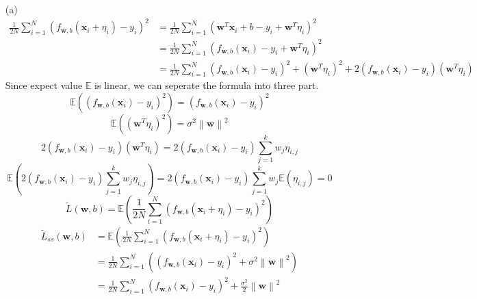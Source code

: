 \documentclass[12pt,a4paper]{article}
\begin{document}
\begin{enumerate}
    \item[(a)]
        \begin{align}
            \frac{1}{2N}\sum_{i=1}^{N}(f_{\mathbf{w},b}(\mathbf{x}_{i}+\eta_{i})-y_{i})^{2} 
                &= \frac{1}{2N}\sum_{i=1}^{N}(\mathbf{w}^{T}\mathbf{x}_i + b - y_{i} + \mathbf{w}^{T}\eta_{i})^2 \\
                &= \frac{1}{2N}\sum_{i=1}^{N}(f_{\mathbf{w}, b}(\mathbf{x}_i) - y_{i} + \mathbf{w}^{T}\eta_{i})^2 \\
                &= \frac{1}{2N}\sum_{i=1}^{N}(f_{\mathbf{w}, b}(\mathbf{x}_i) - y_{i})^2 + (\mathbf{w}^{T}\eta_{i})^2 + 2(f_{\mathbf{w}, b}(\mathbf{x}_i) - y_{i})(\mathbf{w}^{T}\eta_{i})
        \end{align}
        Since expect value $\mathbb{E}$ is linear, we can seperate the formula into three part.
        \[
            \mathbb{E}((f_{\mathbf{w},b}(\mathbf{x}_{i})-y_{i})^2) = (f_{\mathbf{w},b}(\mathbf{x}_{i})-y_{i})^2
        \]
        \[
            \mathbb{E}((\mathbf{w}^{T}\eta_{i})^2) = \sigma^{2}\left\lVert \mathbf{w}\right\rVert ^{2}
        \]
        \[
            2(f_{\mathbf{w}, b}(\mathbf{x}_i) - y_{i})(\mathbf{w}^{T}\eta_{i}) = 2(f_{\mathbf{w}, b}(\mathbf{x}_i) - y_{i}) \sum_{j=1}^{k} w_{j}\eta_{i,j}
        \]
        \[
            \mathbb{E}(2(f_{\mathbf{w}, b}(\mathbf{x}_i) - y_{i}) \sum_{j=1}^{k} w_{j}\eta_{i,j}) = 2(f_{\mathbf{w}, b}(\mathbf{x}_i) - y_{i}) \sum_{j=1}^{k} w_{j}\mathbb{E}(\eta_{i,j})=0
        \]
        \[
            \tilde{L} (\mathbf{w}, b) = \mathbb{E}(\frac{1}{2N}\sum_{i=1}^{N}(f_{\mathbf{w},b}(\mathbf{x}_{i}+\eta_{i})-y_{i})^{2})
        \]
        \begin{align}
            \tilde{L}_{ss} (\mathbf{w}, b) 
                &= \mathbb{E}(\frac{1}{2N}\sum_{i=1}^{N}(f_{\mathbf{w},b}(\mathbf{x}_{i}+\eta_{i})-y_{i})^{2}) \\
                &= \frac{1}{2N}\sum_{i=1}^{N}((f_{\mathbf{w},b}(\mathbf{x}_{i})-y_{i})^2 + \sigma^{2}\left\lVert \mathbf{w}\right\rVert ^{2})\\
                &= \frac{1}{2N}\sum_{i=1}^{N}(f_{\mathbf{w},b}(\mathbf{x}_{i})-y_{i})^2 + \frac{\sigma^{2}}{2}\left\lVert \mathbf{w}\right\rVert ^{2}
        \end{align}
\end{enumerate}
\end{document}
